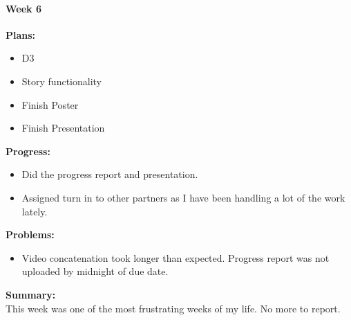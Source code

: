 \paragraph{Week 6}
\begin{adjustwidth}{2.5em}{0pt}
    \vspace{-0.5cm}\textbf{Plans:}
    \vspace{-0.5cm}
    \begin{itemize}
        \item D3 
        \item Story functionality
        \item Finish Poster
        \item Finish Presentation
    \end{itemize} 
    \vspace{-0.3cm}\textbf{Progress:}
    \vspace{-0.5cm}
    \begin{itemize}
        \item Did the progress report and presentation. 
        \item Assigned turn in to other partners as I have been handling a lot of the work lately. 
    \end{itemize} 
    \vspace{-0.3cm}\textbf{Problems:}
    \vspace{-0.5cm}
    \begin{itemize}
        \item Video concatenation took longer than expected. Progress report was not uploaded by midnight of due date.
    \end{itemize}  
    \vspace{-0.3cm}\noindent\textbf{Summary:}\\
    \noindent This week was one of the most frustrating weeks of my life. No more to report. 
\end{adjustwidth} 
